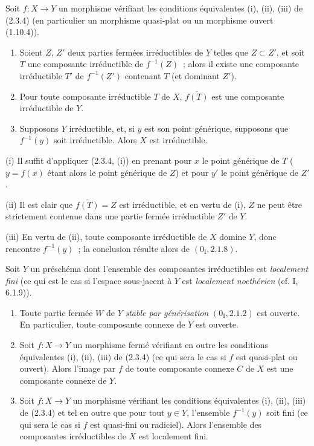 \begin{corollary}[2.3.5]
\label{IV.2.3.5-fr}
Soit $f:X\to Y$ un morphisme vérifiant les conditions équivalentes (i), (ii),
(iii) de (2.3.4) (en particulier un morphisme quasi-plat ou un morphisme
ouvert (1.10.4)).
\begin{enumerate}
  \item[(i)] Soient $Z$, $Z'$ deux parties fermées irréductibles de $Y$ telles
  que $Z\subset Z'$, et soit $T$ une composante irréductible de $f^{-1}(Z)$~;
  alors il existe une composante irréductible $T'$ de $f^{-1}(Z')$ contenant
  $T$ (et dominant $Z'$).
  \item[(ii)] Pour toute composante irréductible $T$ de $X$,
  $\overline{f(T)}$ est une composante irréductible de $Y$.
  \item[(iii)] Supposons $Y$ irréductible, et, si $y$ est son point générique,
  supposons que $f^{-1}(y)$ soit irréductible. Alors $X$ est irréductible.
\end{enumerate}
\end{corollary}

(i) Il suffit d'appliquer (2.3.4, (i)) en prenant pour $x$ le point générique
de $T$ ($y=f(x)$ étant alors le point générique de $Z$) et pour $y'$ le point
générique de $Z'$.

(ii) Il est clair que $\overline{f(T)}=Z$ est irréductible, et en vertu de (i),
$Z$ ne peut être strictement contenue dans une partie fermée irréductible $Z'$
de $Y$.

(iii) En vertu de (ii), toute composante irréductible de $X$ domine $Y$, donc
rencontre $f^{-1}(y)$~; la conclusion résulte alors de
$(0_{\mathrm I},2.1.8)$.

\begin{proposition}[2.3.6]
\label{IV.2.3.6-fr}
Soit $Y$ un préschéma dont l'ensemble des composantes irréductibles est
\emph{localement fini} (ce qui est le cas si l'espace sous-jacent à $Y$ est
\emph{localement noethérien} (cf. I, 6.1.9)).
\begin{enumerate}
  \item[(i)] Toute partie fermée $W$ de $Y$ \emph{stable par générisation}
  $(0_{\mathrm I},2.1.2)$ est ouverte. En particulier, toute composante
  connexe de $Y$ est ouverte.
  \item[(ii)] Soit $f:X\to Y$ un morphisme fermé vérifiant en outre les
  conditions équivalentes (i), (ii), (iii) de (2.3.4) (ce qui sera le cas si
  $f$ est quasi-plat ou ouvert). Alors l'image par $f$ de toute composante
  connexe $C$ de $X$ est une composante connexe de $Y$.
  \item[(iii)] Soit $f:X\to Y$ un morphisme vérifiant les conditions
  équivalentes (i), (ii), (iii) de (2.3.4) et tel en outre que pour tout
  $y\in Y$, l'ensemble $f^{-1}(y)$ soit fini (ce qui sera le cas si $f$ est
  quasi-fini ou radiciel). Alors l'ensemble des composantes irréductibles de
  $X$ est localement fini.
\end{enumerate}
\end{proposition}

